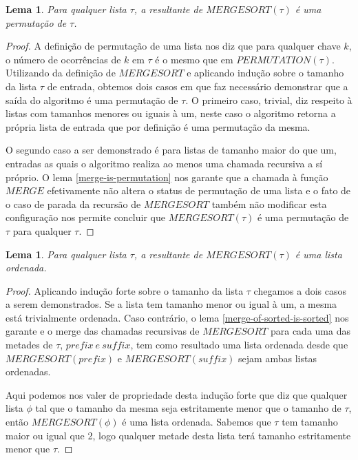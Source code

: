 \documentclass[12pt]{article}
\newtheorem{lemma}[theorem]{Lema}
\theoremstyle{definition}
\begin{document}
\begin{lemma}
\label{mergesort-is-permutation}
        Para qualquer lista $\tau$, a resultante de $MERGESORT(\tau)$ é uma permutação de $\tau$.
\end{lemma}

\begin{proof}
        A definição de permutação de uma lista nos diz que para qualquer chave $k$, o número de ocorrências
        de $k$ em $\tau$ é o mesmo que em $PERMUTATION(\tau)$. Utilizando da definição de $MERGESORT$ e aplicando
        indução sobre o tamanho da lista $\tau$ de entrada, obtemos dois casos em que faz necessário demonstrar que
        a saída do algoritmo é uma permutação de $\tau$. O primeiro caso, trivial, diz respeito à listas com tamanhos menores
        ou iguais à um, neste caso o algoritmo retorna a própria lista de entrada que por definição é uma permutação da mesma.
        
        O segundo caso a ser demonstrado é para listas de tamanho maior do que um, entradas as quais o algoritmo realiza ao menos
        uma chamada recursiva a sí próprio. O lema \ref{merge-is-permutation} nos garante que a chamada à função $MERGE$
        efetivamente não altera o status de permutação de uma lista e o fato de o caso de parada da recursão de $MERGESORT$ também
        não modificar esta configuração nos permite concluir que $MERGESORT(\tau)$ é uma permutação de $\tau$ para qualquer $\tau$.
\end{proof}

\begin{lemma}
\label{mergesort-sorts}
        Para qualquer lista $\tau$, a resultante de $MERGESORT(\tau)$ é uma lista ordenada.
\end{lemma}

\begin{proof}
        Aplicando indução forte sobre o tamanho da lista $\tau$ chegamos a dois casos a serem demonstrados.
        Se a lista tem tamanho menor ou igual à um, a mesma está trivialmente ordenada. Caso contrário,
        o lema \ref{merge-of-sorted-is-sorted} nos garante e o merge das chamadas recursivas de $MERGESORT$
        para cada uma das metades de $\tau$, $prefix\ e\ suffix$,  tem como resultado uma lista ordenada
        desde que $MERGESORT(prefix)$ e $MERGESORT(suffix)$ sejam ambas listas ordenadas.

        Aqui podemos nos valer de propriedade desta indução forte que diz que qualquer lista $\phi$ tal que
        o tamanho da mesma seja estritamente menor que o tamanho de $\tau$, então $MERGESORT(\phi)$ é uma lista
        ordenada. Sabemos que $\tau$ tem tamanho maior ou igual que 2, logo qualquer metade desta lista
        terá tamanho estritamente menor que $\tau$.
\end{proof}
\end{document}
